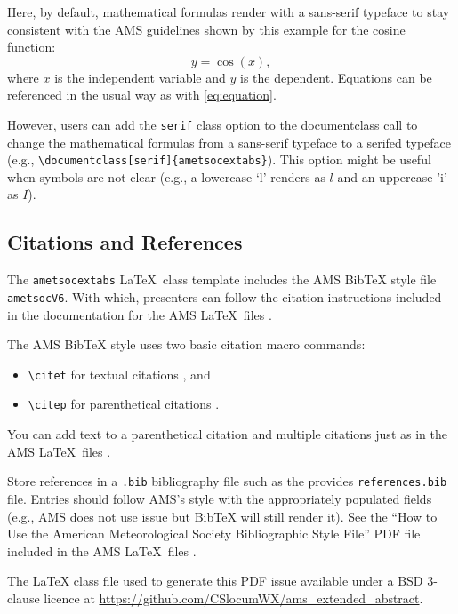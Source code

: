 \documentclass[9pt]{ametsocextabs}
\begin{document}
Here, by default, mathematical formulas render with a sans-serif
typeface to stay consistent with the AMS guidelines shown by this
example for the cosine function:
\begin{equation}
    y = \cos (x),
    \label{eq:equation}
\end{equation}
where $x$ is the independent variable and $y$ is the dependent.
Equations can be referenced in the usual way as with \eqref{eq:equation}.

However, users can add the \texttt{serif} class option to the
documentclass call to change the mathematical formulas from a
sans-serif typeface to a serifed typeface (e.g.,
\texttt{\textbackslash documentclass[serif]\{ametsocextabs\}}). This
option might be useful when symbols are not clear (e.g., a lowercase
`l' renders as $l$ and an uppercase 'i' as $I$).

\subsection{Citations and References}
The \lowercase{\texttt{ametsocextabs}} \LaTeX\ class template
includes the AMS BibTeX style file \texttt{ametsocV6}. With which,
presenters can follow the citation instructions included in the
documentation for the AMS \LaTeX\ files \cite{AMS2025latex, AMS2025doc}.

The AMS BibTeX style uses two basic citation macro commands:
\begin{itemize}
    \item \texttt{\textbackslash citet} for textual citations \rightarrow \citet{Eliassen1951}, and
    \item \texttt{\textbackslash citep} for parenthetical citations  \rightarrow \citep{Eliassen1951}.
\end{itemize}
You can add text to a parenthetical citation and multiple
citations just as in the AMS \LaTeX\ files
\citep[e.g.,][]{Eliassen1951,AMS2025latex, AMS2025doc}.

Store references in a \texttt{.bib} bibliography file such as the
provides \texttt{references.bib} file. Entries should follow AMS's
style with the appropriately populated fields (e.g., AMS does not
use issue but BibTeX will still render it). See the ``How to Use the
American Meteorological Society Bibliographic Style File'' PDF file
included in the AMS \LaTeX\ files \cite{AMS2025latex, AMS2025doc}.

%
\datastatement The LaTeX class file used to generate this PDF issue
available under a BSD 3-clause licence at
\url{https://github.com/CSlocumWX/ams_extended_abstract}.
\end{document}
